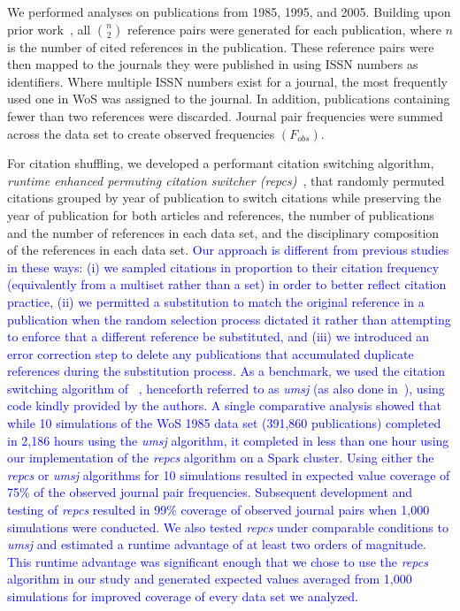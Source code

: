\documentclass[NETN]{stjour}
\begin{document}
We performed analyses on publications from 1985, 1995, and 2005. Building upon prior work~\citep{uzzi_atypical_2013}, all ${n \choose 2}$ reference pairs were generated for each publication, where $n$ is the number of cited references in the publication. These reference pairs were then mapped to the journals they were published in using ISSN numbers as identifiers. Where multiple ISSN numbers exist for a journal, the most frequently used one in WoS was assigned to the journal. In addition, publications containing fewer than two references were discarded. Journal pair frequencies were summed across the data set to create observed frequencies $(F_{obs})$. 

For citation shuffling, we developed a performant citation switching algorithm, \emph{runtime enhanced permuting citation switcher (repcs)}~\citep{GithubERNIE2019}, that randomly permuted citations grouped by year of publication to switch citations while preserving the year of publication for both articles and references, the number of publications and the number of references in each data set, and the disciplinary composition of the references in each data set. 
\textcolor{blue}{Our approach is different from previous studies in these ways: (i) we sampled citations in proportion to their citation frequency (equivalently from a multiset rather than a set) in order to better reflect citation practice, 
(ii) we permitted a substitution to match the original reference in a publication when the random selection process dictated it rather than attempting to enforce that a different reference be substituted, and (iii) we introduced an error correction step to delete any publications that accumulated duplicate references during the substitution process.  As a benchmark, we used the citation switching algorithm of ~\cite{uzzi_atypical_2013}, henceforth referred to  as \emph{umsj} (as also done in~\cite{boyack_vs_uzzi_2014}), using code kindly provided by the authors. A single comparative analysis showed that while 10 simulations of the WoS 1985 data set (391,860 publications) completed in 2,186 hours using the \emph{umsj} algorithm, it completed in less than one hour using our implementation of the \emph{repcs}   algorithm on a Spark  cluster. Using either the \emph{repcs}   or \emph{umsj} algorithms for 10 simulations resulted in expected value coverage of 75\% of the observed journal pair frequencies. Subsequent development and testing of \emph{repcs} resulted in 99\% coverage of observed journal pairs when 1,000 simulations were conducted. We also tested \emph{repcs}  under comparable conditions to \emph{umsj} and estimated a runtime advantage of at least two orders of magnitude. This runtime advantage was significant enough that we chose to use the \emph{repcs}   algorithm in our study and generated expected values averaged from 1,000 simulations for improved coverage of every data set we analyzed.} 
\end{document}
